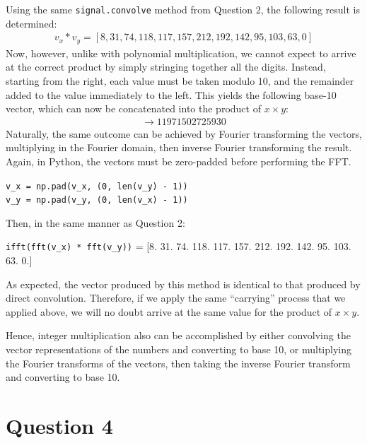 \documentclass[a4paper, 11pt]{article}
\begin{document}
Using the same \texttt{signal.convolve} method from Question 2, the following
result is determined:
\begin{align*}
    v_x \ast v_y = [8, 31, 74, 118, 117, 157, 212, 192, 142, 95, 103, 63, 0]
\end{align*}
Now, however, unlike with polynomial multiplication, we cannot expect to
arrive at the correct product by simply stringing together all the digits.
Instead, starting from the right, each value must be taken modulo 10, and the
remainder added to the value immediately to the left. This yields the following
base-10 vector, which can now be concatenated into the product of $x \times y$:
\begin{align*}
    [1, 1, 9, 7, 1, 5, 0, 2, 7, 2, 5, 9, 3, 0] \longrightarrow 11971502725930
\end{align*}
Naturally, the same outcome can be achieved by Fourier transforming the vectors,
multiplying in the Fourier domain, then inverse Fourier transforming the result.
Again, in Python, the vectors must be zero-padded before performing the FFT.
\begin{center}
    \texttt{v\_x = np.pad(v\_x, (0, len(v\_y) - 1))} \\
    \texttt{v\_y = np.pad(v\_y, (0, len(v\_x) - 1))}
\end{center}
Then, in the same manner as Question 2:
\begin{center}
    \texttt{ifft(fft(v\_x) * fft(v\_y))} =
        [8.  31.  74. 118. 117. 157. 212. 192. 142.  95. 103.  63.   0.]
\end{center}
As expected, the vector produced by this method is identical to that produced by
direct convolution. Therefore, if we apply the same ``carrying'' process that we
applied above, we will no doubt arrive at the same value for the product of
$x\times y$.

Hence, integer multiplication also can be accomplished by either convolving the
vector representations of the numbers and converting to base 10, or multiplying
the Fourier transforms of the vectors, then taking the inverse Fourier transform
and converting to base 10.

\newpage
\section*{Question 4}
\end{document}
